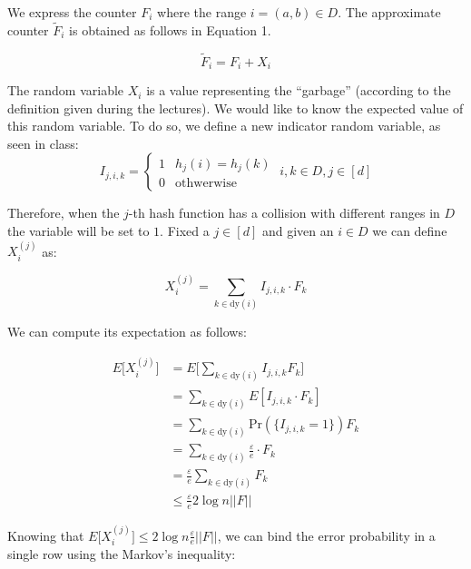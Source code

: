 \documentclass{article}
\begin{document}
\noindent We express the counter $F_{i}$ where the range $i = (a, b) \in D$. The approximate counter $\tilde{F}_{i}$ is obtained
as follows in Equation 1.

\begin{equation}
    \tilde{F}_{i} = F_{i} + X_i
\end{equation}

\noindent The random variable $X_{i}$ is a value representing the ``garbage'' (according to the definition given during the lectures). We would like to know the expected value of this random variable.
To do so, we define a new indicator random variable, as seen in class:
\begin{equation*}
    I_{j,i,k} = \begin{cases}
        1 & h_j(i) = h_j(k) \\
        0 & \textrm{othwerwise}
    \end{cases} \; i, k \in D, j \in [d]
\end{equation*}

\noindent Therefore, when the $j$-th hash function has a collision with different ranges in $D$ the variable will be set to $1$. 
Fixed a $j \in [d]$ and given an $i \in D$ we can define $X_{i}^{(j)}$ as: 

\begin{equation*}
    X_{i}^{(j)} = \sum_{k \in \textrm{dy}(i)}I_{j, i, k} \cdot  F_k
\end{equation*}

\noindent We can compute its expectation as follows:

\begin{equation*}
    \begin{split}
        E\bigg[X_{i}^{(j)}\bigg] & = E\bigg[\sum_{k \in \textrm{dy}(i)}I_{j, i, k} F_k\bigg] \\
        & = \sum_{k \in \textrm{dy}(i)} E[I_{j, i, k} \cdot F_k] \\
        & = \sum_{k \in \textrm{dy}(i)} \textrm{Pr}(\{I_{j, i, k} = 1\}) F_k \\
        & = \sum_{k \in \textrm{dy}(i)} \frac{\varepsilon}{e} \cdot  F_k \\ 
        & = \frac{\varepsilon}{e} \sum_{k \in \textrm{dy}(i)} F_k \\
        & \le \frac{\varepsilon}{e} 2 \log n ||F||
    \end{split}
\end{equation*}

\noindent Knowing that $E\big[X_{i}^{(j)}\big] \le 2 \log n \frac{\varepsilon}{e} ||F||$, we can bind the error probability in a single row using the Markov's inequality:
\end{document}
